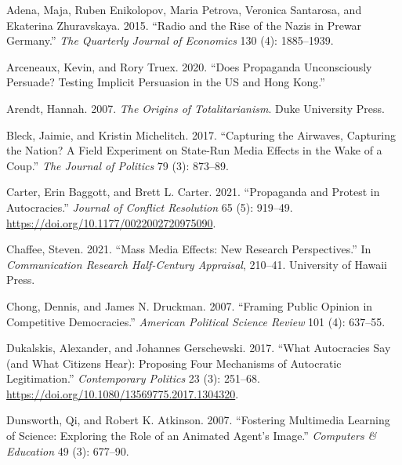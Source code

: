 \documentclass[
  12pt,
]{ctexart}
\newlength{\cslhangindent}
\newlength{\cslentryspacingunit} %
\newenvironment{CSLReferences}[2] %
 {%
  \setlength{\parindent}{0pt}
  \ifodd #1
  \let\oldpar\par
  \def\par{\hangindent=\cslhangindent\oldpar}
  \fi
  \setlength{\parskip}{#2\cslentryspacingunit}
 }%
 {}
\begin{document}
\hypertarget{refs}{}
\begin{CSLReferences}{1}{0}
\leavevmode{}%
Adena, Maja, Ruben Enikolopov, Maria Petrova, Veronica Santarosa, and Ekaterina Zhuravskaya. 2015. {``Radio and the {Rise} of the {Nazis} in {Prewar Germany}.''} \emph{The Quarterly Journal of Economics} 130 (4): 1885--1939.

\leavevmode{}%
Arceneaux, Kevin, and Rory Truex. 2020. {``Does {Propaganda Unconsciously Persuade}? {Testing Implicit Persuasion} in the {US} and {Hong Kong}.''}

\leavevmode{}%
Arendt, Hannah. 2007. \emph{The Origins of Totalitarianism}. {Duke University Press}.

\leavevmode{}%
Bleck, Jaimie, and Kristin Michelitch. 2017. {``Capturing the Airwaves, Capturing the Nation? {A} Field Experiment on State-Run Media Effects in the Wake of a Coup.''} \emph{The Journal of Politics} 79 (3): 873--89.

\leavevmode{}%
Carter, Erin Baggott, and Brett L. Carter. 2021. {``Propaganda and {Protest} in {Autocracies}.''} \emph{Journal of Conflict Resolution} 65 (5): 919--49. \url{https://doi.org/10.1177/0022002720975090}.

\leavevmode{}%
Chaffee, Steven. 2021. {``Mass Media Effects: {New} Research Perspectives.''} In \emph{Communication Research Half-Century Appraisal}, 210--41. {University of Hawaii Press}.

\leavevmode{}%
Chong, Dennis, and James N. Druckman. 2007. {``Framing Public Opinion in Competitive Democracies.''} \emph{American Political Science Review} 101 (4): 637--55.

\leavevmode{}%
Dukalskis, Alexander, and Johannes Gerschewski. 2017. {``What Autocracies Say (and What Citizens Hear): Proposing Four Mechanisms of Autocratic Legitimation.''} \emph{Contemporary Politics} 23 (3): 251--68. \url{https://doi.org/10.1080/13569775.2017.1304320}.

\leavevmode{}%
Dunsworth, Qi, and Robert K. Atkinson. 2007. {``Fostering Multimedia Learning of Science: {Exploring} the Role of an Animated Agent's Image.''} \emph{Computers \& Education} 49 (3): 677--90.


\end{CSLReferences}
\end{document}
